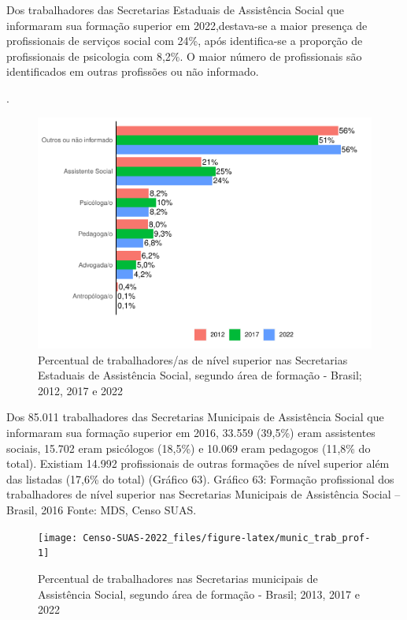 \documentclass[
  brazilian]{report}
\begin{document}
Dos trabalhadores das Secretarias Estaduais de Assistência Social que
informaram sua formação superior em 2022,destava-se a maior presença de
profissionais de serviços social com 24\%, após identifica-se a
proporção de profissionais de psicologia com 8,2\%. O maior número de
profissionais são identificados em outras profissões ou não informado.

.

\begin{figure}
\includegraphics{Censo-SUAS-2022_files/figure-latex/uf_trab_prof-1} \caption[Percentual de trabalhadores/as de nível superior nas Secretarias Estaduais de Assistência Social, segundo área de formação - Brasil]{Percentual de trabalhadores/as de nível superior nas Secretarias Estaduais de Assistência Social, segundo área de formação - Brasil; 2012, 2017 e 2022}\label{fig:uf_trab_prof}
\end{figure}

Dos 85.011 trabalhadores das Secretarias Municipais de Assistência
Social que informaram sua formação superior em 2016, 33.559 (39,5\%)
eram assistentes sociais, 15.702 eram psicólogos (18,5\%) e 10.069 eram
pedagogos (11,8\% do total). Existiam 14.992 profissionais de outras
formações de nível superior além das listadas (17,6\% do total) (Gráfico
63). Gráfico 63: Formação profissional dos trabalhadores de nível
superior nas Secretarias Municipais de Assistência Social -- Brasil,
2016 Fonte: MDS, Censo SUAS.

\begin{figure}
\texttt{[image: Censo-SUAS-2022\_files/figure-latex/munic\_trab\_prof-1]} \caption[Percentual de trabalhadores nas Secretarias municipais de Assistência Social, segundo área de formação - Brasil]{Percentual de trabalhadores nas Secretarias municipais de Assistência Social, segundo área de formação - Brasil; 2013, 2017 e 2022}\label{fig:munic_trab_prof}
\end{figure}
\end{document}
